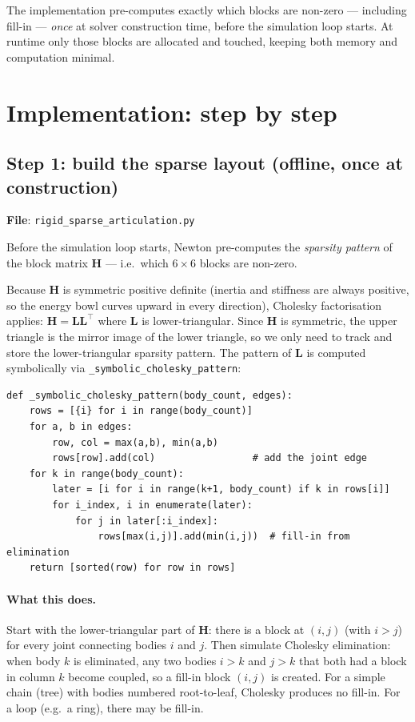 \documentclass[11pt,a4paper]{article}
\begin{document}
The implementation pre-computes exactly which blocks are non-zero — including
fill-in — \emph{once} at solver construction time, before the simulation
loop starts.  At runtime only those blocks are allocated and touched,
keeping both memory and computation minimal.

\section{Implementation: step by step}

\subsection{Step 1: build the sparse layout (offline, once at construction)}
\label{sec:layout}

\textbf{File}: \texttt{rigid\_sparse\_articulation.py}

Before the simulation loop starts, Newton pre-computes the \emph{sparsity
pattern} of the block matrix $\mathbf{H}$ — i.e.\ which $6\times 6$ blocks
are non-zero.

Because $\mathbf{H}$ is symmetric positive definite (inertia and stiffness
are always positive, so the energy bowl curves upward in every direction),
Cholesky factorisation applies: $\mathbf{H} = \mathbf{L}\mathbf{L}^\top$
where $\mathbf{L}$ is lower-triangular.  Since $\mathbf{H}$ is symmetric,
the upper triangle is the mirror image of the lower triangle, so we only
need to track and store the lower-triangular sparsity pattern.  The pattern
of $\mathbf{L}$ is computed symbolically via
\texttt{\_symbolic\_cholesky\_pattern}:

\begin{lstlisting}
def _symbolic_cholesky_pattern(body_count, edges):
    rows = [{i} for i in range(body_count)]
    for a, b in edges:
        row, col = max(a,b), min(a,b)
        rows[row].add(col)                 # add the joint edge
    for k in range(body_count):
        later = [i for i in range(k+1, body_count) if k in rows[i]]
        for i_index, i in enumerate(later):
            for j in later[:i_index]:
                rows[max(i,j)].add(min(i,j))  # fill-in from elimination
    return [sorted(row) for row in rows]
\end{lstlisting}

\paragraph{What this does.}
Start with the lower-triangular part of $\mathbf{H}$: there is a block at
$(i, j)$ (with $i > j$) for every joint connecting bodies $i$ and $j$.
Then simulate Cholesky elimination: when body $k$ is eliminated, any two
bodies $i > k$ and $j > k$ that both had a block in column $k$ become
coupled, so a fill-in block $(i, j)$ is created.  For a simple chain (tree)
with bodies numbered root-to-leaf, Cholesky produces no fill-in.  For a loop
(e.g.\ a ring), there may be fill-in.
\end{document}
